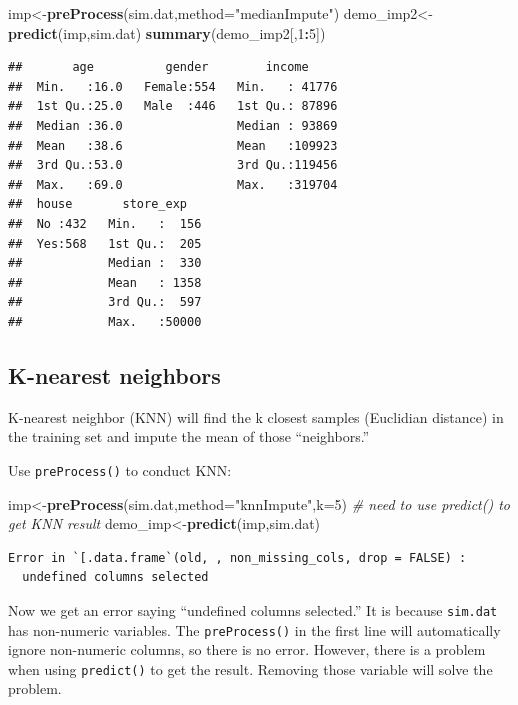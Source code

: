 \documentclass[12pt,]{krantz}
\newenvironment{Shaded}{\begin{snugshade}}{\end{snugshade}}
\newcommand{\KeywordTok}[1]{\textcolor[rgb]{0.13,0.29,0.53}{\textbf{#1}}}
\newcommand{\DataTypeTok}[1]{\textcolor[rgb]{0.13,0.29,0.53}{#1}}
\newcommand{\DecValTok}[1]{\textcolor[rgb]{0.00,0.00,0.81}{#1}}
\newcommand{\StringTok}[1]{\textcolor[rgb]{0.31,0.60,0.02}{#1}}
\newcommand{\CommentTok}[1]{\textcolor[rgb]{0.56,0.35,0.01}{\textit{#1}}}
\newcommand{\OperatorTok}[1]{\textcolor[rgb]{0.81,0.36,0.00}{\textbf{#1}}}
\newcommand{\NormalTok}[1]{#1}
\theoremstyle{definition}
\theoremstyle{definition}
\theoremstyle{definition}
\theoremstyle{remark}
\begin{document}
\begin{Shaded}
\begin{Highlighting}[]
\NormalTok{imp<-}\KeywordTok{preProcess}\NormalTok{(sim.dat,}\DataTypeTok{method=}\StringTok{"medianImpute"}\NormalTok{)}
\NormalTok{demo_imp2<-}\KeywordTok{predict}\NormalTok{(imp,sim.dat)}
\KeywordTok{summary}\NormalTok{(demo_imp2[,}\DecValTok{1}\OperatorTok{:}\DecValTok{5}\NormalTok{])}
\end{Highlighting}
\end{Shaded}

\begin{verbatim}
##       age          gender        income      
##  Min.   :16.0   Female:554   Min.   : 41776  
##  1st Qu.:25.0   Male  :446   1st Qu.: 87896  
##  Median :36.0                Median : 93869  
##  Mean   :38.6                Mean   :109923  
##  3rd Qu.:53.0                3rd Qu.:119456  
##  Max.   :69.0                Max.   :319704  
##  house       store_exp    
##  No :432   Min.   :  156  
##  Yes:568   1st Qu.:  205  
##            Median :  330  
##            Mean   : 1358  
##            3rd Qu.:  597  
##            Max.   :50000
\end{verbatim}

\subsection{K-nearest neighbors}\label{k-nearest-neighbors}

K-nearest neighbor (KNN) will find the k closest samples (Euclidian
distance) in the training set and impute the mean of those
``neighbors.''

Use \texttt{preProcess()} to conduct KNN:

\begin{Shaded}
\begin{Highlighting}[]
\NormalTok{imp<-}\KeywordTok{preProcess}\NormalTok{(sim.dat,}\DataTypeTok{method=}\StringTok{"knnImpute"}\NormalTok{,}\DataTypeTok{k=}\DecValTok{5}\NormalTok{)}
\CommentTok{# need to use predict() to get KNN result}
\NormalTok{demo_imp<-}\KeywordTok{predict}\NormalTok{(imp,sim.dat)}
\end{Highlighting}
\end{Shaded}

\begin{verbatim}
Error in `[.data.frame`(old, , non_missing_cols, drop = FALSE) : 
  undefined columns selected
\end{verbatim}

Now we get an error saying ``undefined columns selected.'' It is because
\texttt{sim.dat} has non-numeric variables. The \texttt{preProcess()} in
the first line will automatically ignore non-numeric columns, so there
is no error. However, there is a problem when using \texttt{predict()}
to get the result. Removing those variable will solve the problem.
\end{document}
